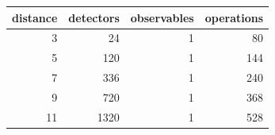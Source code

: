 \begin{tabular}{rrrr}
\toprule
distance & detectors & observables & operations \\
\midrule
3 & 24 & 1 & 80 \\
5 & 120 & 1 & 144 \\
7 & 336 & 1 & 240 \\
9 & 720 & 1 & 368 \\
11 & 1320 & 1 & 528 \\
\bottomrule
\end{tabular}
